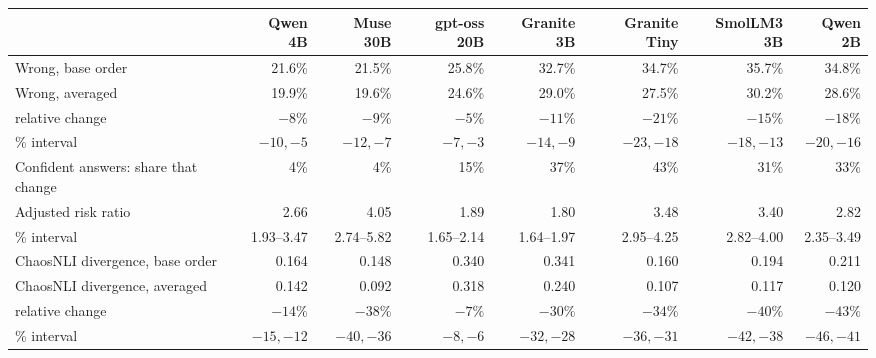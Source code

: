 \begin{tabular}{@{}lrrrrrrr@{}}
\toprule
 & Qwen 4B & Muse 30B & gpt-oss 20B & Granite 3B & Granite Tiny & SmolLM3 3B & Qwen 2B \\
\midrule
Wrong, base order & 21.6\% & 21.5\% & 25.8\% & 32.7\% & 34.7\% & 35.7\% & 34.8\% \\
Wrong, averaged & 19.9\% & 19.6\% & 24.6\% & 29.0\% & 27.5\% & 30.2\% & 28.6\% \\
\quad relative change & $-8\%$ & $-9\%$ & $-5\%$ & $-11\%$ & $-21\%$ & $-15\%$ & $-18\%$ \\
\quad 95\% interval & $-10, -5$ & $-12, -7$ & $-7, -3$ & $-14, -9$ & $-23, -18$ & $-18, -13$ & $-20, -16$ \\
\midrule
Confident answers: share that change & 4\% & 4\% & 15\% & 37\% & 43\% & 31\% & 33\% \\
Adjusted risk ratio & 2.66 & 4.05 & 1.89 & 1.80 & 3.48 & 3.40 & 2.82 \\
\quad 95\% interval & 1.93--3.47 & 2.74--5.82 & 1.65--2.14 & 1.64--1.97 & 2.95--4.25 & 2.82--4.00 & 2.35--3.49 \\
\midrule
ChaosNLI divergence, base order & 0.164 & 0.148 & 0.340 & 0.341 & 0.160 & 0.194 & 0.211 \\
ChaosNLI divergence, averaged & 0.142 & 0.092 & 0.318 & 0.240 & 0.107 & 0.117 & 0.120 \\
\quad relative change & $-14\%$ & $-38\%$ & $-7\%$ & $-30\%$ & $-34\%$ & $-40\%$ & $-43\%$ \\
\quad 95\% interval & $-15, -12$ & $-40, -36$ & $-8, -6$ & $-32, -28$ & $-36, -31$ & $-42, -38$ & $-46, -41$ \\
\bottomrule
\end{tabular}
